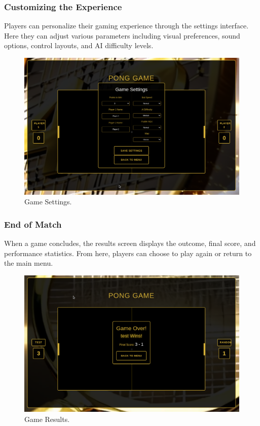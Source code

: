 \subsubsection{Customizing the Experience} Players can personalize their gaming experience through the settings interface. Here they can adjust various parameters including visual preferences, sound options, control layouts, and AI difficulty levels.

\begin{figure}[H]
    \centering
    \includegraphics[width=0.65\linewidth]{Figures/images/new_images/GameSettings.png}
    \caption{Game Settings.} %
    \label{fig:game-settings-journey}
\end{figure}

\subsubsection{End of Match} When a game concludes, the results screen displays the outcome, final score, and performance statistics. From here, players can choose to play again or return to the main menu.

\begin{figure}[H]
    \centering
    \includegraphics[width=0.65\linewidth]{Figures/images/new_images/GameResult.png}
    \caption{Game Results.} %
    \label{fig:game-result-journey}
\end{figure}

